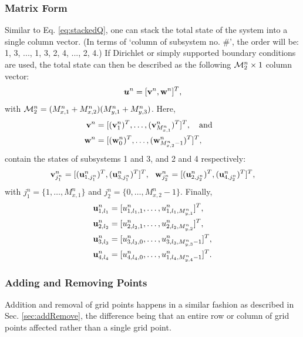 \documentclass[fleqn]{jaes}
\begin{document}
\subsubsection{Matrix Form}
Similar to Eq. \eqref{eq:stackedQ}, one can stack the total state of the system into a single column vector. (In terms of `column of subsystem no. \#', the order will be: 1, 3, ..., 1, 3, 2, 4, ..., 2, 4.) If Dirichlet or simply supported boundary conditions are used, the total state can then be described as the following ${\mathcal{M}_2^n} \times 1$ column vector:
\begin{equation}\label{eq:stacked2D}
     \uStack^n = [\v^n, \w^n]^T,
\end{equation}
with ${\mathcal{M}_2^n} =(M_{x, 1}^n + M_{x, 2}^n) (M_{y, 1}^n + M_{y, 3}^n)$. Here,
\begin{equation}\label{eq:vw}
\begin{aligned}
    \v^n &= [(\v_{1}^n)^T,\hdots, (\v_{M_{x,1}^n}^n)^T]^T, \qaq\\
    \w^n &= [(\w_{0}^n)^T, \hdots, (\w_{M_{x, 2}^n-1}^n)^T]^T,
\end{aligned}
\end{equation}
contain the states of subsystems 1 and 3, and 2 and 4 respectively:
\begin{equation*}
     \mathbf{v}_{j_1^n}^n = [(\mathbf{u}_{1, j_1^n}^n)^T, (\mathbf{u}_{3, j_1^n}^n)^T]^T, \ \ \mathbf{w}_{j_2^n}^n = [(\mathbf{u}_{2, j_2^n}^n)^T, (\mathbf{u}_{4, j_2^n}^n)^T]^T,
\end{equation*}
with $j_1^n = \{1, \hdots, M_{x,1}^n\}$ and $j_2^n = \{0, \hdots, M_{x,2}^n-1\}$. Finally, 
\begin{equation}\label{eq:2DuDefs}
    \begin{aligned}
         \u_{1,l_1}^n &= [u_{1, l_1, 1}^n, \hdots, u_{1, l_1, M_{y, 1}^n}^n]^T,
         \\
         \u_{2,l_2}^n &= [u_{2, l_2, 1}^n, \hdots, u_{2, l_2, M_{y, 2}^n}^n]^T,\\
         \u_{3,l_3}^n &= [u_{3, l_3, 0}^n, \hdots, u_{3, l_3, M_{y, 3}^n-1}^n]^T,\\
         \u_{4,l_4}^n &= [u_{4, l_4, 0}^n, \hdots, u_{1, l_4, M_{y, 4}^n-1}^n]^T.
     \end{aligned}
\end{equation}

\subsubsection{Adding and Removing Points}
Addition and removal of grid points happens in a similar fashion as described in Sec. \ref{sec:addRemove}, the difference being that an entire row or column of grid points affected rather than a single grid point.
\end{document}
